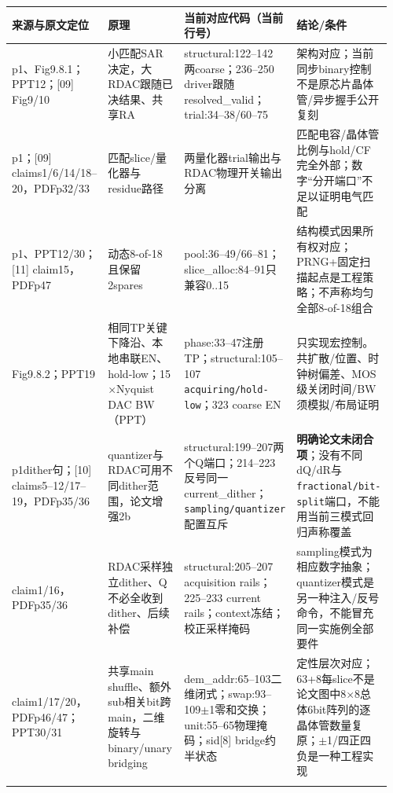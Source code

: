 \documentclass[UTF8,fontset=fandol,10pt,a4paper,openany]{ctexrep}
\newcommand{\code}[1]{\nolinkurl{#1}}
\begin{document}
\begingroup\small\setlength{\tabcolsep}{2pt}\renewcommand{\arraystretch}{1.25}\begin{longtable}{@{}>{\raggedright\arraybackslash}p{0.19\linewidth}>{\raggedright\arraybackslash}p{0.24\linewidth}>{\raggedright\arraybackslash}p{0.27\linewidth}>{\raggedright\arraybackslash}p{0.26\linewidth}@{}}
\toprule
\textbf{来源与原文定位} & \textbf{原理} & \textbf{当前对应代码（当前行号）} & \textbf{结论/条件}\\\midrule\endhead
[00] p1、Fig9.8.1；PPT12；[09] Fig9/10 & 小匹配SAR决定，大RDAC跟随已决结果、共享RA & structural:122–142 两coarse；236–250 driver跟随resolved\_valid；trial:34–38/60–75 & 架构对应；当前同步binary控制不是原芯片晶体管/异步握手公开复刻\\\addlinespace[2pt]
[00] p1；[09] claims1/6/14/18–20，PDFp32/33 & 匹配slice/量化器与residue路径 & 两量化器trial输出与RDAC物理开关输出分离 & 匹配电容/晶体管比例与hold/CF完全外部；数字“分开端口”不足以证明电气匹配\\\addlinespace[2pt]
[00] p1、PPT12/30；[11] claim15，PDFp47 & 动态8-of-18且保留2spares & pool:36–49/66–81；slice\_alloc:84–91只兼容0..15 & 结构模式因果所有权对应；PRNG+固定扫描起点是工程策略；不声称均匀全部8-of-18组合\\\addlinespace[2pt]
[00] Fig9.8.2；PPT19 & 相同TP关键下降沿、本地串联EN、hold-low；15\ensuremath{\times}Nyquist DAC BW（PPT） & phase:33–47注册TP；structural:105–107 \code{acquiring/hold-low}；323 coarse EN & 只实现宏控制。共扩散/位置、时钟树偏差、MOS级关闭时间/BW须模拟/布局证明\\\addlinespace[2pt]
[00] p1dither句；[10] claims5–12/17–19，PDFp35/36 & quantizer与RDAC可用不同dither范围，论文增强2b & structural:199–207两个Q端口；214–223反号同一current\_dither；\code{sampling/quantizer}配置互斥 & \textbf{明确论文未闭合项}；没有不同dQ/dR与\code{fractional/bit-split}端口，不能用当前三模式回归声称覆盖\\\addlinespace[2pt]
[10] claim1/16，PDFp35/36 & RDAC采样独立dither、Q不必全收到dither、后续补偿 & structural:205–207 acquisition rails；225–233 current rails；context冻结；校正采样掩码 & sampling模式为相应数字抽象；quantizer模式是另一种注入/反号命令，不能冒充同一实施例全部要件\\\addlinespace[2pt]
[11] claim1/17/20，PDFp46/47；PPT30/31 & 共享main shuffle、额外sub相关bit跨main，二维旋转与binary/unary bridging & dem\_addr:65–103二维闭式；swap:93–109\ensuremath{\pm}1零和交换；unit:55–65物理掩码；sid[8] bridge约半状态 & 定性层次对应；63+8每slice不是论文图中8\ensuremath{\times}8总体6bit阵列的逐晶体管数量复原；\ensuremath{\pm}1/四正四负是一种工程实现\\\addlinespace[2pt]

\end{longtable}
\end{document}
